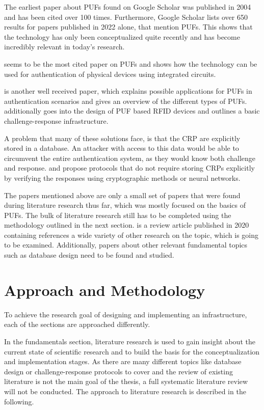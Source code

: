 The earliest paper about \acp{PUF} found on Google Scholar was published in 2004 and has been cited over 100 times.
Furthermore, Google Scholar lists over 650 results for papers published in 2022 alone,
that mention \acp{PUF}. This shows that the technology has only been conceptualized quite recently 
and has become incredibly relevant in today's research.

\cite{Suh2007} seems to be the most cited paper on \acp{PUF} and shows how the technology can
be used for authentication of physical devices using integrated circuits.

\cite{Herder2014} is another well received paper, which explains possible applications
for \acp{PUF} in authentication scenarios and gives an overview of the different types
of \acp{PUF}. \cite{Devadas2008} additionally goes into the design of \ac{PUF} based
\ac{RFID} devices and outlines a basic challenge-response infrastructure.

A problem that many of these solutions face, is that the \ac{CRP} are explicitly stored
in a database. An attacker with access to this data would be able to
circumvent the entire authentication system, as they would know both challenge and response.
\cite{Chatterjee2019} and \cite{Yilmaz2018} propose protocols that do not require storing \acp{CRP} explicitly
by verifying the responses using cryptographic methods or neural networks.

The papers mentioned above are only a small set of papers that were found during
literature research thus far, which was mostly focused on the basics of \acp{PUF}.
The bulk of literature research still has to be completed using the methodology outlined in the next section.
\cite{Gao2020} is a review article published in 2020 containing references a wide variety
of other research on the topic, which is going to be examined. Additionally, papers about
other relevant fundamental topics such as database design need to be found and studied.

\newpage
\section{Approach and Methodology}

To achieve the research goal of designing and implementing an infrastructure,
each of the sections are approached differently.

In the fundamentals section, literature research is used to gain insight about the current
state of scientific research and to build the basis for the conceptualization and implementation stages.
As there are many different topics like database design or challenge-response protocols to cover
and the review of existing literature is not the main goal of the thesis, a full systematic literature
review will not be conducted. The approach to literature research is described in the following.

